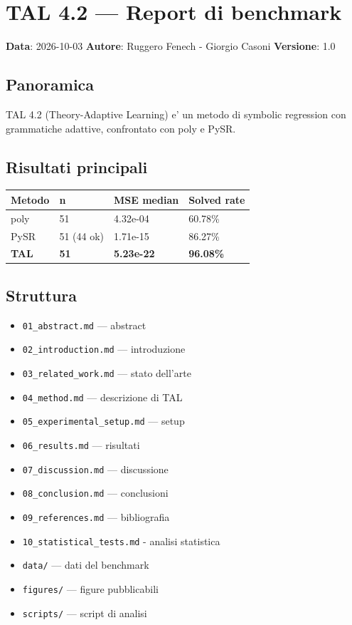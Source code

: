 \documentclass[
]{article}
\author{}
\date{}
\providecommand{\tightlist}{%
  \setlength{\itemsep}{0pt}\setlength{\parskip}{0pt}}
\begin{document}
\section{TAL 4.2 --- Report di
benchmark}\label{tal-4.2-report-di-benchmark}

\textbf{Data}: 2026-10-03 \textbf{Autore}: Ruggero Fenech - Giorgio
Casoni \textbf{Versione}: 1.0

\subsection{Panoramica}\label{panoramica}

TAL 4.2 (Theory-Adaptive Learning) e' un metodo di symbolic regression
con grammatiche adattive, confrontato con poly e PySR.

\subsection{Risultati principali}\label{risultati-principali}

\begin{longtable}[]{@{}llll@{}}
\toprule\noalign{}
Metodo & n & MSE median & Solved rate \\
\midrule\noalign{}
\endhead
\bottomrule\noalign{}
\endlastfoot
poly & 51 & 4.32e-04 & 60.78\% \\
PySR & 51 (44 ok) & 1.71e-15 & 86.27\% \\
\textbf{TAL} & \textbf{51} & \textbf{5.23e-22} & \textbf{96.08\%} \\
\end{longtable}

\subsection{Struttura}\label{struttura}

\begin{itemize}
\tightlist
\item
  \texttt{01\_abstract.md} --- abstract
\item
  \texttt{02\_introduction.md} --- introduzione
\item
  \texttt{03\_related\_work.md} --- stato dell'arte
\item
  \texttt{04\_method.md} --- descrizione di TAL
\item
  \texttt{05\_experimental\_setup.md} --- setup
\item
  \texttt{06\_results.md} --- risultati
\item
  \texttt{07\_discussion.md} --- discussione
\item
  \texttt{08\_conclusion.md} --- conclusioni
\item
  \texttt{09\_references.md} --- bibliografia
\item
  \texttt{10\_statistical\_tests.md} - analisi statistica
\item
  \texttt{data/} --- dati del benchmark
\item
  \texttt{figures/} --- figure pubblicabili
\item
  \texttt{scripts/} --- script di analisi
\end{itemize}
\end{document}
